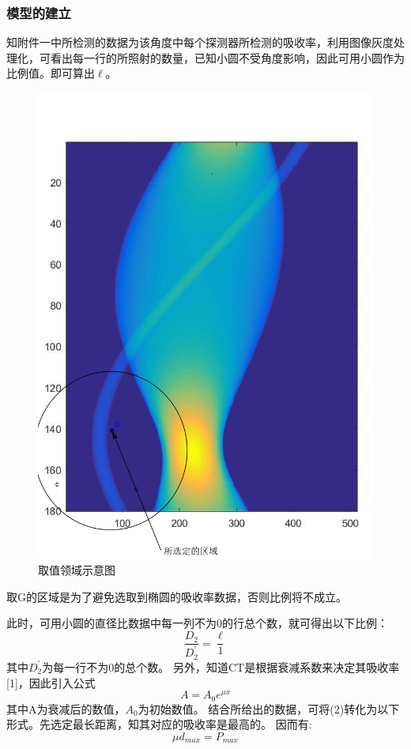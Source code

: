 \documentclass[withoutpreface,bwprint]{cumcmthesis} %
\begin{document}
\subsubsection{模型的建立}
知附件一中所检测的数据为该角度中每个探测器所检测的吸收率，利用图像灰度处理化，可看出每一行的所照射的数量，已知小圆不受角度影响，因此可用小圆作为比例值。即可算出$\ell$。
\begin{figure}[H]
\centering
\includegraphics[width=.6\textwidth]{2.png}
\caption{取值领域示意图}
\end{figure}
\par
取G的区域是为了避免选取到椭圆的吸收率数据，否则比例将不成立。

此时，可用小圆的直径比数据中每一列不为0的行总个数，就可得出以下比例：
\begin{equation}
\frac{ D_2}{D^{'}_{2}} = \frac{\ell }{1} 
\end{equation}
其中$D^{'}_{2}$为每一行不为0的总个数。
另外，知道CT是根据衰减系数来决定其吸收率[1]，因此引入公式
\begin{equation}
A=A_0e^{{\mu}x}
\end{equation}
其中A为衰减后的数值，$A_0$为初始数值。
结合所给出的数据，可将(2)转化为以下形式。先选定最长距离，知其对应的吸收率是最高的。
因而有:
\begin{equation}
{\mu}d_{max}=P_{max}
\end{equation}
\end{document}
